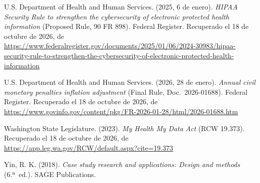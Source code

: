 \documentclass[12pt, a4paper]{article}
\begin{document}
\begin{list}{}{\setlength{\leftmargin}{1.27cm}\setlength{\itemindent}{-1.27cm}%
  \setlength{\labelwidth}{0pt}\setlength{\labelsep}{0pt}\setlength{\itemsep}{6pt}}

\item U.S. Department of Health and Human Services. (2025,
  6 de enero). \textit{HIPAA Security Rule to strengthen the
  cybersecurity of electronic protected health information}
  (Proposed Rule, 90 FR 898). Federal Register. Recuperado el 18 de octubre de 2026, de \url{https://www.federalregister.gov/documents/2025/01/06/2024-30983/hipaa-security-rule-to-strengthen-the-cybersecurity-of-electronic-protected-health-information}


\item U.S. Department of Health and Human Services. (2026,
  28 de enero). \textit{Annual civil monetary penalties
  inflation adjustment} (Final Rule, Doc.~2026-01688). Federal
  Register.
  Recuperado el 18 de octubre de 2026, de \url{https://www.govinfo.gov/content/pkg/FR-2026-01-28/html/2026-01688.htm}
 
 
 
\item Washington State Legislature. (2023). \textit{My Health My
  Data Act} (RCW 19.373).
  Recuperado el 18 de octubre de 2026, de \url{https://app.leg.wa.gov/RCW/default.aspx?cite=19.373}




\item Yin, R. K. (2018). \textit{Case study research and
  applications: Design and methods} (6.ª~ed.). SAGE Publications.


\end{list}
\end{document}
